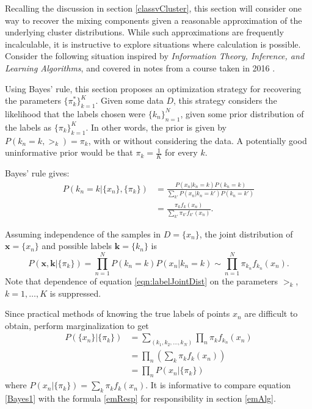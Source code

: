 Recalling the discussion in section \ref{classvCluster}, this section will consider one way to recover the mixing components given a reasonable approximation of the underlying cluster distributions. While such approximations are frequently incalculable, it is instructive to explore situations where calculation is possible. Consider the following situation inspired by \textit{Information Theory, Inference, and Learning Algorithms}\citep{MacKay2002}, and covered in notes from a course taken in 2016 \cite{rychlikCourse}.

Using Bayes' rule, this section proposes an optimization strategy for recovering the parameters $\{\pi_k^{\ast}\}_{k=1}^{K}$. Given some data $D$, this strategy considers the likelihood that the labels chosen were $\{k_n\}_{n=1}^{N}$, given some prior distribution of the labels as $\{\pi_k\}_{k=1}^{K}$. In other words, the prior is given by $P(k_n=k, \bm \gt_k) = \pi_k$, with or without considering the data. A potentially good uninformative prior would be that $\pi_k=\frac 1K$ for every $k$.

Bayes' rule gives:
\begin{align}\label{Bayes1}
P(k_n=k|\{x_n\},\{\pi_k\})&=\frac{P(x_n|k_n=k)P(k_n=k)}{\sum_{k'}P(x_n|k_n=k')P(k_n=k')} \nonumber \\
						  &=\frac{\pi_k f_k(x_n)}{\sum_{k'}\pi_{k'} f_{k'}(x_n)}.
\end{align}

Assuming independence of the samples in \( D = \{x_n\} \), the joint distribution of $\bm x = \{x_n\}$ and possible labels $\bm k = \{k_n\}$ is 
\begin{equation}\label{eqn:labelJointDist}
P(\bm x, \bm k |\{\pi_k\})=\prod_{n=1}^{N} P(k_n=k)P(x_n|k_n=k) \sim\prod_{n=1}^{N} \pi_{k_n}f_{k_n}(x_n).
\end{equation}
Note that dependence of equation \eqref{eqn:labelJointDist} on the parameters \( \bm\gt_k \), \( k=1,\ldots,K \) is suppressed.

Since practical methods of knowing the true labels of points $x_n$ are difficult to obtain, perform marginalization to get
\begin{align*}
P(\{x_n\}|\{\pi_k\})&=\sum_{(k_1,k_2,\ldots,k_N)}\prod_n \pi_{k}f_{k_n}(x_n)\\
&= \prod_n \left(\sum_{k}\pi_kf_k(x_n)\right)\\
&= \prod_n P(x_n|\{\pi_k\})
\end{align*}
where $\displaystyle{P(x_n|\{\pi_k\}) =\sum_{k}\pi_kf_k(x_n)}$.  It is informative to compare equation \eqref{Bayes1} with the formula \eqref{emResp} for responsibility in section \ref{emAlg}.

